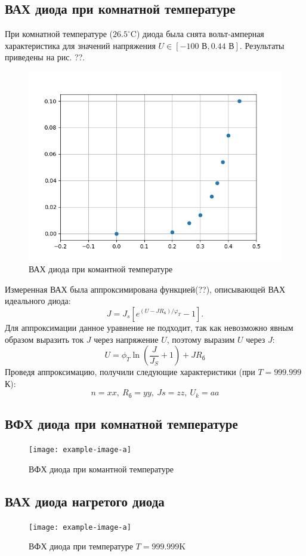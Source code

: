 \subsection{ВАХ диода при комнатной температуре}
При комнатной температуре ($26.5^{\circ}$C) диода была снята вольт-амперная характеристика для значений напряжения $U \in
[-100\text{ В},0.44\text{ В}]$. Результаты приведены на рис. ??.
\begin{figure}[h!]
    \centering
    \includegraphics[width = 0.7\linewidth]{imgs/vah1.png}
    \caption{ВАХ диода при комантной температуре}
    \label{fig:vah}
\end{figure}
Измеренная ВАХ была аппроксимирована функцией(??), описывающей ВАХ идеального диода:
\begin{equation}
    J=J_s[e^{(U-JR_{\text{б}})/\varphi_T}-1].
    \label{eq:id}
\end{equation}
Для аппроксимации данное уравнение не подходит, так как невозможно явным образом выразить ток $J$ через напряжение
$U$, поэтому выразим $U$ через $J$: 
\begin{equation}
    U = \phi_T \ln{(\frac{J}{J_S}+1 )}+J R_{\text{б}}
    \label{eq:id2}
\end{equation}
Проведя аппроксимацию, получили следующие характеристики (при $T=999.999$К):
\begin{equation}
    n = xx,~ R_{\text{б}} = yy,~Js = zz,~ U_k = aa
\end{equation}
\subsection{ВФХ диода при комнатной температуре}
\begin{figure}[h!]
    \centering
    \texttt{[image: example-image-a]}
    \caption{ВФХ диода при комантной температуре}
    \label{fig:vfh}
\end{figure}
\subsection{ВАХ диода нагретого диода}
\begin{figure}[h!]
    \centering
    \texttt{[image: example-image-a]}
    \caption{ВФХ диода при температуре $T = 999.999$K}
    \label{fig:vaht}
\end{figure}













